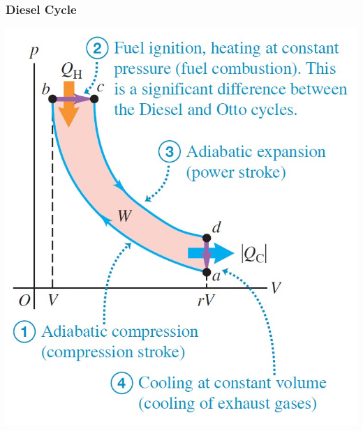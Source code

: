 \documentclass{article}
\begin{document}
\subsubsection{Diesel Cycle}
\begin{center}
    \includegraphics[scale=0.3]{images/diesel_cycle.jpg}
\end{center}
\end{document}
